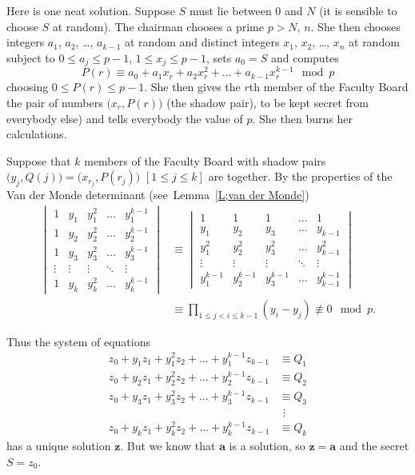 Here is one neat solution. Suppose $S$ must lie between
$0$ and $N$ (it is sensible to choose $S$ at random).
The chairman chooses
a prime $p>N,\,n$. She then chooses integers
$a_{1}$, $a_{2}$, \dots, $a_{k-1}$ at random
and distinct integers
$x_{1}$, $x_{2}$, \dots, $x_{n}$ at random 
subject to $0\leq a_{j}\leq p-1$, 
$1\leq x_{j}\leq p-1$, sets $a_{0}=S$
and computes 
\[P(r)\equiv a_{0}+a_{1}x_{r}+a_{2}x_{r}^{2}+\dots+a_{k-1}x_{r}^{k-1}\mod{p}\]
choosing $0\leq P(r)\leq p-1$.
She then gives the $r$th member of the Faculty Board
the pair of numbers $\big(x_{r},P(r)\big)$ (the shadow pair), 
to be kept secret
from everybody else) and tells everybody the value of $p$.
She then burns her calculations.

Suppose that $k$ members of the Faculty Board
with shadow pairs
$\big(y_{j},Q(j)\big)=\big(x_{r_{j}},P(r_{j})\big)$ 
$[1\leq j\leq k]$ are together.
By the properties of the Van der Monde determinant
(see~Lemma~\ref{L;van der Monde})   
\begin{align*}
\begin{vmatrix}
1&y_{1}&y_{1}^{2}&\hdots&y_{1}^{k-1}\\
1&y_{2}&y_{2}^{2}&\hdots&y_{2}^{k-1}\\
1&y_{3}&y_{3}^{2}&\hdots&y_{3}^{k-1}\\
\vdots&\vdots&\vdots&\ddots&\vdots\\
1&y_{k}&y_{k}^{2}&\hdots&y_{k}^{k-1}
\end{vmatrix}
&\equiv
\begin{vmatrix}
1&1&1&\hdots&1\\
y_{1}&y_{2}&y_{3}&\hdots&y_{k-1}\\
y_{1}^{2}&y_{2}^{2}&y_{3}^{2}&\hdots&y_{k-1}^{2}\\
\vdots&\vdots&\vdots&\ddots&\vdots\\
y_{1}^{k-1}&y_{2}^{k-1}&y_{3}^{k-1}&\hdots&y_{k-1}^{k-1}
\end{vmatrix}\\
&\equiv\prod_{1\leq j<i\leq k-1}(y_{i}-y_{j})\not\equiv 0\mod{p}.
\end{align*}

Thus the system of equations
\begin{align*}
z_{0}+y_{1}z_{1}+y_{1}^{2}z_{2}+\hdots+y_{1}^{k-1}z_{k-1}
&\equiv Q_{1}\\
z_{0}+y_{2}z_{1}+y_{2}^{2}z_{2}+\hdots+y_{2}^{k-1}z_{k-1}
&\equiv Q_{2}\\
z_{0}+y_{3}z_{1}+y_{3}^{2}z_{2}+\hdots+y_{3}^{k-1}z_{k-1}
&\equiv Q_{3}\\
&\ \,\vdots\\
z_{0}+y_{k}z_{1}+y_{k}^{2}z_{2}+\hdots+y_{k}^{k-1}z_{k-1}&\equiv Q_{k}
\end{align*}
has a unique solution ${\mathbf z}$. But we know that
${\mathbf a}$ is a solution, so ${\mathbf z}={\mathbf a}$
and the secret $S=z_{0}$.

